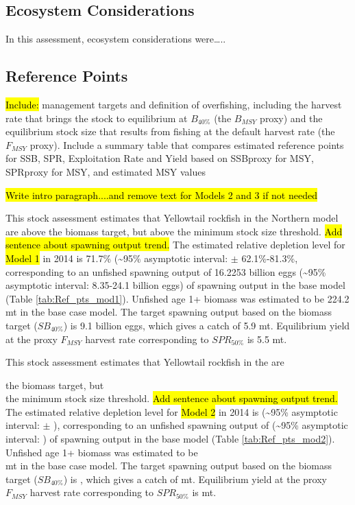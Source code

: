 \documentclass[12pt,]{article}
\begin{document}
\FloatBarrier

\subsection*{Ecosystem Considerations}\label{ecosystem-considerations}

In this assessment, ecosystem considerations were\ldots{}..

\subsection*{Reference Points}\label{reference-points}

\hl{Include:} management targets and definition of overfishing,
including the harvest rate that brings the stock to equilibrium at
\(B_{40\%}\) (the \(B_{MSY}\) proxy) and the equilibrium stock size that
results from fishing at the default harvest rate (the \(F_{MSY}\)
proxy). Include a summary table that compares estimated reference points
for SSB, SPR, Exploitation Rate and Yield based on SSBproxy for MSY,
SPRproxy for MSY, and estimated MSY values

\hl{Write intro paragraph....and remove text for Models 2 and 3 if not needed}

This stock assessment estimates that Yellowtail rockfish in the Northern
model are above the biomass target, but above the minimum stock size
threshold. \hl{Add sentence about spawning output trend.} The estimated
relative depletion level for \hl{Model 1} in 2014 is 71.7\%
(\textasciitilde{}95\% asymptotic interval: \(\pm\) 62.1\%-81.3\%,
corresponding to an unfished spawning output of 16.2253 billion eggs
(\textasciitilde{}95\% asymptotic interval: 8.35-24.1 billion eggs) of
spawning output in the base model (Table \ref{tab:Ref_pts_mod1}).
Unfished age 1+ biomass was estimated to be 224.2 mt in the base case
model. The target spawning output based on the biomass target
(\(SB_{40\%}\)) is 9.1 billion eggs, which gives a catch of 5.9 mt.
Equilibrium yield at the proxy \(F_{MSY}\) harvest rate corresponding to
\(SPR_{50\%}\) is 5.5 mt.

This stock assessment estimates that Yellowtail rockfish in the are

the biomass target, but\\
the minimum stock size threshold.
\hl{Add sentence about spawning output trend.} The estimated relative
depletion level for \hl{Model 2} in 2014 is (\textasciitilde{}95\%
asymptotic interval: \(\pm\) ), corresponding to an unfished spawning
output of (\textasciitilde{}95\% asymptotic interval: ) of spawning
output in the base model (Table \ref{tab:Ref_pts_mod2}). Unfished age 1+
biomass was estimated to be\\
mt in the base case model. The target spawning output based on the
biomass target (\(SB_{40\%}\)) is , which gives a catch of mt.
Equilibrium yield at the proxy \(F_{MSY}\) harvest rate corresponding to
\(SPR_{50\%}\) is mt.
\end{document}
